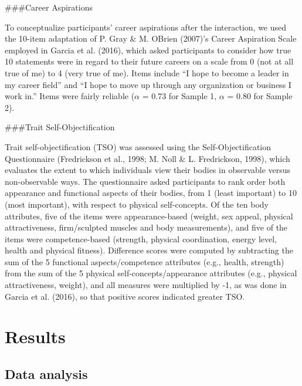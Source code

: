 \documentclass[
  man]{apa6}
\begin{document}
\#\#\#Career Aspirations

To conceptualize participants' career aspirations after the interaction, we used the 10-item adaptation of P. Gray \& M. OBrien (2007)'s Career Aspiration Scale employed in Garcia et al. (2016), which asked participants to consider how true 10 statements were in regard to their future careers on a scale from 0 (not at all true of me) to 4 (very true of me). Items include \enquote{I hope to become a leader in my career field} and \enquote{I hope to move up through any organization or business I work in.} Items were fairly reliable (\(\alpha\) = 0.73 for Sample 1, \(\alpha\) = 0.80 for Sample 2).

\#\#\#Trait Self-Objectification

Trait self-objectification (TSO) was assessed using the Self-Objectification Questionnaire (Fredrickson et al., 1998; M. Noll \& L. Fredrickson, 1998), which evaluates the extent to which individuals view their bodies in observable versus non-observable ways. The questionnaire asked participants to rank order both appearance and functional aspects of their bodies, from 1 (least important) to 10 (most important), with respect to physical self-concepts. Of the ten body attributes, five of the items were appearance-based (weight, sex appeal, physical attractiveness, firm/sculpted muscles and body measurements), and five of the items were competence-based (strength, physical coordination, energy level, health and physical fitness). Difference scores were computed by subtracting the sum of the 5 functional aspects/competence attributes (e.g., health, strength) from the sum of the 5 physical self-concepts/appearance attributes (e.g., physical attractiveness, weight), and all measures were multiplied by -1, as was done in Garcia et al. (2016), so that positive scores indicated greater TSO.

\hypertarget{results}{%
\section{Results}\label{results}}

\hypertarget{data-analysis}{%
\subsection{Data analysis}\label{data-analysis}}
\end{document}
